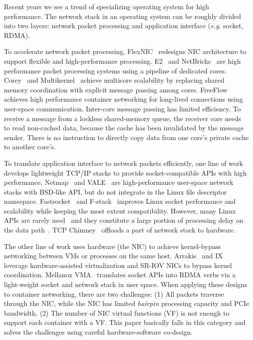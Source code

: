 
Recent years we see a trend of specializing operating system for high performance.
The network stack in an operating system can be roughly divided into two layers: network packet processing and application interface (\textit{e.g.} socket, RDMA).

To accelerate network packet processing,
FlexNIC~\cite{kaufmann2015flexnic} redesigns NIC architecture to support flexible and high-performance processing.
E2~\cite{palkar2015e2} and NetBricks~\cite{panda2016netbricks} are high performance packet processing systems using a pipeline of dedicated cores.
Corey~\cite{boyd2008corey} and Multikernel~\cite{baumann2009multikernel} achieve multicore scalability by replacing shared memory coordination with explicit message passing among cores.
FreeFlow~\cite{freeflow} achieves high performance container networking for long-lived connections using user-space communication.
Inter-core message passing has limited efficiency. To receive a message from a lockless shared-memory queue, the receiver core needs to read non-cached data, because the cache has been invalidated by the message sender. There is no instruction to directly copy data from one core's private cache to another core's.

To translate application interface to network packets efficiently, one line of work develops lightweight TCP/IP stacks to provide socket-compatible APIs with high performance.
Netmap~\cite{rizzo2012netmap} and VALE~\cite{rizzo2012vale} are high-performance user-space network stacks with BSD-like API, but do not integrate in the Linux file descriptor namespace.
Fastsocket~\cite{lin2016scalable} and F-stack~\cite{fstack} improves Linux socket performance and scalability while keeping the most extent compatibility.
However, many Linux APIs are rarely used~\cite{tsai2016study} and they constitute a large portion of processing delay on the data path~\cite{peter2016arrakis}.
TCP Chimney~\cite{networking2004network} offloads a part of network stack to hardware.

The other line of work uses hardware (the NIC) to achieve kernel-bypass networking between VMs or processes on the same host.
Arrakis~\cite{peter2016arrakis} and IX~\cite{belay2014ix} leverage hardware-assisted virtualization and SR-IOV NICs to bypass kernel coordination.
Mellanox VMA~\cite{libvma} translates socket APIs into RDMA verbs via a light-weight socket and network stack in user space.
When applying these designs to container networking, there are two challenges: (1) All packets traverse through the NIC, while the NIC has limited \textit{hairpin} processing capacity and PCIe bandwidth. (2) The number of NIC virtual functions (VF) is not enough to support each container with a VF.
This paper basically falls in this category and solves the challenges using careful hardware-software co-design.

